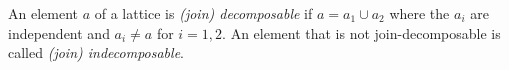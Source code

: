 An element $a$ of a lattice is \textit{(join) decomposable} if $a = a_1 \cup a_2$ where the $a_i$ are independent and $a_i \neq a$ for $i = 1, 2$. An element that is not join-decomposable is called \textit{(join) indecomposable}.

